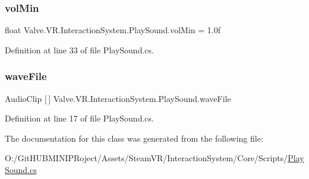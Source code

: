 \subsubsection{\texorpdfstring{volMin}{volMin}}
{\footnotesize\ttfamily float Valve.\+V\+R.\+Interaction\+System.\+Play\+Sound.\+vol\+Min = 1.\+0f}



Definition at line 33 of file Play\+Sound.\+cs.

\mbox{\label{class_valve_1_1_v_r_1_1_interaction_system_1_1_play_sound_ac8133bd7a943717ea4f870ef8551ea2b}} 
\subsubsection{\texorpdfstring{waveFile}{waveFile}}
{\footnotesize\ttfamily Audio\+Clip \mbox{[}$\,$\mbox{]} Valve.\+V\+R.\+Interaction\+System.\+Play\+Sound.\+wave\+File}



Definition at line 17 of file Play\+Sound.\+cs.



The documentation for this class was generated from the following file\+:\begin{DoxyCompactItemize}
\item 
O\+:/\+Git\+H\+U\+B\+M\+I\+N\+I\+P\+Roject/\+Assets/\+Steam\+V\+R/\+Interaction\+System/\+Core/\+Scripts/\mbox{\hyperlink{_play_sound_8cs}{Play\+Sound.\+cs}}\end{DoxyCompactItemize}

